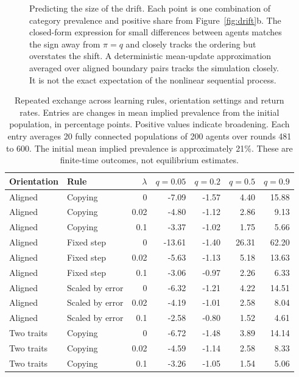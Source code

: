 \begin{figure}[htbp]
\centering
\figpred
\caption{Predicting the size of the drift. Each point is one combination of category prevalence and positive share from Figure~\ref{fig:drift}b. The closed-form expression for small differences between agents matches the sign away from $\pi=q$ and closely tracks the ordering but overstates the shift. A deterministic mean-update approximation averaged over aligned boundary pairs tracks the simulation closely. It is not the exact expectation of the nonlinear sequential process.}
\label{fig:pred}
\end{figure}

\begin{table}[htbp]
\centering
\caption{Repeated exchange across learning rules, orientation settings and return rates. Entries are changes in mean implied prevalence from the initial population, in percentage points. Positive values indicate broadening. Each entry averages 20 fully connected populations of 200 agents over rounds 481 to 600. The initial mean implied prevalence is approximately 21\%. These are finite-time outcomes, not equilibrium estimates.}
\label{tab:repeated}
\begingroup\small\setlength{\tabcolsep}{4pt}
\begin{tabular}{llrrrrr}
\toprule
Orientation & Rule & $\lambda$ & $q=0.05$ & $q=0.2$ & $q=0.5$ & $q=0.9$ \\
\midrule
Aligned & Copying & 0 & -7.09 & -1.57 & 4.40 & 15.88 \\
Aligned & Copying & 0.02 & -4.80 & -1.12 & 2.86 & 9.13 \\
Aligned & Copying & 0.1 & -3.37 & -1.02 & 1.75 & 5.66 \\
Aligned & Fixed step & 0 & -13.61 & -1.40 & 26.31 & 62.20 \\
Aligned & Fixed step & 0.02 & -5.63 & -1.13 & 5.18 & 13.63 \\
Aligned & Fixed step & 0.1 & -3.06 & -0.97 & 2.26 & 6.33 \\
Aligned & Scaled by error & 0 & -6.32 & -1.21 & 4.22 & 14.51 \\
Aligned & Scaled by error & 0.02 & -4.19 & -1.01 & 2.58 & 8.04 \\
Aligned & Scaled by error & 0.1 & -2.58 & -0.80 & 1.52 & 4.61 \\
Two traits & Copying & 0 & -6.72 & -1.48 & 3.89 & 14.14 \\
Two traits & Copying & 0.02 & -4.59 & -1.14 & 2.58 & 8.33 \\
Two traits & Copying & 0.1 & -3.26 & -1.05 & 1.54 & 5.06 \\

\end{tabular}
\end{table}
